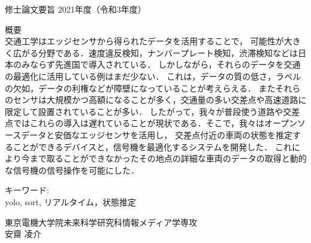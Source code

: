 \newpage
\pagestyle{plain}
\begin{center}
\LARGE{修士論文要旨 \hspace{10mm} 2021年度（令和3年度）}\\

\vspace{10mm}

\end{center}

\begin{center}
概要\\
交通工学はエッジセンサから得られたデータを活用することで，
可能性が大きく広がる分野である．速度違反検知，ナンバープレート検知，渋滞検知などは日本のみならず先進国で導入されている．
しかしながら，それらのデータを交通の最適化に活用している例はまだ少ない．
これは，データの質の低さ，ラベルの欠如，データの利権などが障壁になっていることが考えらえる．
またそれらのセンサは大規模かつ高額になることが多く，交通量の多い交差点や高速道路に限定して設置されていることが多い．
したがって，我々が普段使う道路や交差点ではこれらの導入は遅れていることが現状である．そこで，我々はオープンソースデータと安価なエッジセンサを活用し，
交差点付近の車両の状態を推定することができるデバイスと，信号機を最適化するシステムを開発した．
これにより今まで取ることができなかったその地点の詳細な車両のデータの取得と動的な信号機の信号操作を可能にした．
\end{center}


\begin{flushleft}キーワード:\\
yolo, sort, リアルタイム，状態推定
\end{flushleft}


\begin{center}
\vspace{10mm}
\begin{flushright}\large 東京電機大学院未来科学研究科情報メディア学専攻\\
\LARGE 安齋 凌介\\
\end{flushright}
\end{center}
